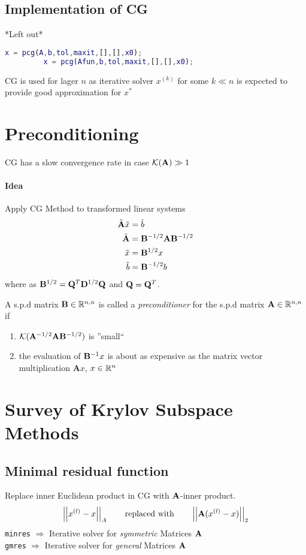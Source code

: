 	\subsection{Implementation of CG}
		*Left out*
		\begin{lstlisting}[language=matlab]
		 x = pcg(A,b,tol,maxit,[],[],x0);
		 x = pcg(Afun,b,tol,maxit,[],[],x0);
		\end{lstlisting}
		
		CG is used for lager $n$ as iterative solver $x^{(k)}$ for some $k\ll n$ is expected to provide good approximation for $x^*$
	\section{Preconditioning}
		CG has a slow convergence rate in case $\mathcal K(\mathbf{A}) \gg 1$
		
		\paragraph{Idea} Apply CG Method to transformed linear systems
		\begin{align*}
		 \tilde{\mathbf{A}} \tilde x &= \tilde b\\ 
		 \tilde{\mathbf{A} } &=\mathbf{B}^{-1/2} \mathbf{A} \mathbf{B}^{-1/2}\\ 
		 \tilde{x} &= \mathbf{B}^{1/2}x \\
		 \tilde b &= \mathbf{B}^{-1/2} b
		\end{align*}
		where as $\mathbf{B}^{1/2} = \mathbf{Q}^T\mathbf{D}^{1/2} \mathbf{Q}$ and $\mathbf{Q} =\mathbf{Q}^T$.
		\begin{notice}[Preconditioner]
		 A s.p.d matrix $\mathbf{B} \in \mathbb{R}^{n,n}$ is called a \emph{preconditioner} for the s.p.d matrix $\mathbf{A} \in \mathbb{R}^{n,n}$ if
		 \begin{enumerate}
		  \item $\mathcal K(\mathbf{A}^{-1/2} \mathbf{A} \mathbf{B} ^{-1/2})$ is ''small``
		  \item the evaluation of $\mathbf{B}^{-1} x$ is about as expensive as the matrix vector multiplication $\mathbf A x$, $x \in \mathbb{R}^n$
		 \end{enumerate}

		\end{notice}
\section{Survey of Krylov Subspace Methods}
	\subsection{Minimal residual function}
		Replace inner Euclidean product in CG with $\mathbf{A}$-inner product.
		\[
		 \left|\left| x^{(l)}-x \right|\right|_A \qquad \text{replaced with} \qquad \left|\left| \mathbf{A}(x^{(l)}-x) \right|\right|_2
		\]
		\verb|minres| $\Longrightarrow$ Iterative solver for \emph{symmetric} Matrices $\mathbf{A}$\\

		\verb|gmres| $\Longrightarrow$ Iterative solver for \emph{general} Matrices $\mathbf{A}$
